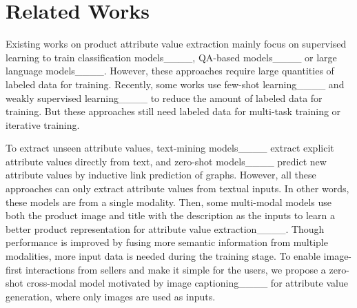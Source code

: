 \section{Related Works}
Existing works on product attribute value extraction mainly focus on supervised learning to train classification models____, QA-based models____ or large language models____. 
However, these approaches require large quantities of labeled data for training.
Recently, some works use few-shot learning____ and weakly supervised learning____ to reduce the amount of labeled data for training. 
But these approaches still need labeled data for multi-task training or iterative training.

To extract unseen attribute values, text-mining models____ extract explicit attribute values directly from text, and zero-shot models____ predict new attribute values by inductive link prediction of graphs.
However, all these approaches can only extract attribute values from textual inputs. 
In other words, these models are from a single modality. 
Then, some multi-modal models use both the product image and title with the description as the inputs to learn a better product representation for attribute value extraction____.
Though performance is improved by fusing more semantic information from multiple modalities, more input data is needed during the training stage. 
To enable image-first interactions from sellers and make it simple for the users, we propose a zero-shot cross-modal model motivated by image captioning____ for attribute value generation, where only images are used as inputs.
